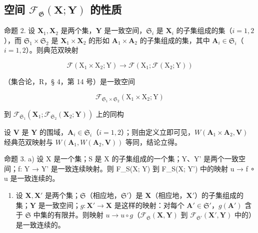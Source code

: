 \subsection{\texorpdfstring{空间 \(\mathcal{F}_{\mathfrak{G}}(\mathbf{X};\mathbf{Y})\) 的性质}{空间 F 下标 G (X;Y) 的性质}}

命题 2. 设 \(\mathbf{X}_1, \mathbf{X}_2\) 是两个集，\(\mathbf{Y}\) 是一致空间，\(\mathfrak{S}_i\) 是 \(\mathbf{X}_i\) 的子集组成的集（\(i = 1, 2\)），而 \(\mathfrak{S}_1 \times \mathfrak{S}_2\) 是 \(\mathbf{X}_1 \times \mathbf{X}_2\) 的形如 \(\mathbf{A}_1 \times \mathbf{A}_2\) 的子集组成的集，其中 \(\mathbf{A}_i \in \mathfrak{S}_i\)（\(i = 1, 2\)）。则典范双映射

\[
\mathscr {F} \left(\mathrm{X} _ {1} \times \mathrm{X} _ {2}; \mathrm{Y}\right)\rightarrow \mathscr {F} \left(\mathrm{X} _ {1}; \mathscr {F} \left(\mathrm{X} _ {2}; \mathrm{Y}\right)\right)
\]

（集合论，R，§ 4，第 14 号）是一致空间

\[
\mathcal {F} _ {\mathfrak {S} _ {1} \times \mathfrak {S} _ {2}} (\mathrm{X} _ {1} \times \mathrm{X} _ {2}; \mathrm{Y})
\]

到 \(\mathcal{F}_{\mathfrak{S}_1}(\mathbf{X}_1;\mathcal{F}_{\mathfrak{S}_2}(\mathbf{X}_2;\mathbf{Y}))\) 上的同构

设 \(\mathbf{V}\) 是 \(\mathbf{Y}\) 的围域，\(\mathbf{A}_i\in \mathfrak{S}_i\)（\(i = 1,2\)）；则由定义立即可见，\(W(\mathbf{A}_1\times \mathbf{A}_2,\mathbf{V})\) 经典范双映射与 \(W(\mathbf{A}_1,W(\mathbf{A}_2,\mathbf{V}))\) 等同，结论立得。

命题 3. a) 设 X 是一个集；S 是 X 的子集组成的一个集；Y、Y' 是两个一致空间；f: Y → Y' 是一致连续映射。则 F\_S(X; Y) 到 F\_S(X; Y') 中的映射 u → f ∘ u 是一致连续的。

\begin{enumerate}
\def\labelenumi{\alph{enumi})}
\setcounter{enumi}{1}
\tightlist
\item
  设 \(\mathbf{X}, \mathbf{X}'\) 是两个集；\(\mathfrak{S}\)（相应地，\(\mathfrak{S}'\)）是 \(\mathbf{X}\)（相应地，\(\mathbf{X}'\)）的子集组成的集；\(\mathbf{Y}\) 是一致空间；\(g: \mathbf{X}' \to \mathbf{X}\) 是这样的映射：对每个 \(\mathbf{A}' \in \mathfrak{S}'\)，\(g(\mathbf{A}')\) 含于 \(\mathfrak{S}\) 中集的有限并。则映射 \(u \to u \circ g\)（\(\mathcal{F}_{\mathfrak{S}}(\mathbf{X}, \mathbf{Y})\) 到 \(\mathcal{F}_{\mathfrak{S}'}(\mathbf{X}', \mathbf{Y})\) 中的）是一致连续的。
\end{enumerate}

